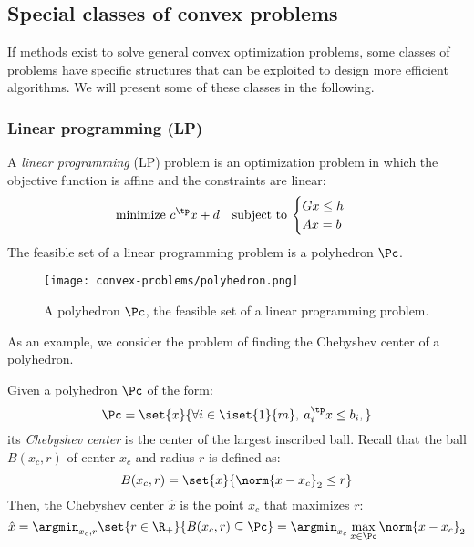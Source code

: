 \subsection{Special classes of convex problems}
If methods exist to solve general convex optimization problems, some classes of problems have specific structures that can be exploited to design more efficient algorithms. We will present some of these classes in the following.

\subsubsection{Linear programming (LP)}
\begin{definition}
    A \emph{linear programming} (LP) problem is an optimization problem in which the objective function is affine and the constraints are linear:
    \begin{equation*}
        \text{minimize } c^\tp x + d\quad\text{subject to}\: \begin{cases}
            Gx\leq h\\
            Ax=b
        \end{cases}
    \end{equation*}
    The feasible set of a linear programming problem is a polyhedron $\Pc$.
    \begin{figure}[H]
        \centering
        \texttt{[image: convex-problems/polyhedron.png]}
        \caption{A polyhedron $\Pc$, the feasible set of a linear programming problem.}
    \end{figure}
\end{definition}

As an example, we consider the problem of finding the Chebyshev center of a polyhedron.
\begin{definition}
    Given a polyhedron $\Pc$ of the form:
    \begin{equation*}
        \Pc = \set{x}{\forall i\in\iset{1}{m}, \: a_i^\tp x\leq b_i,}
    \end{equation*}
    its \emph{Chebyshev center} is the center of the largest inscribed ball. Recall that the ball $B(x_c, r)$ of center $x_c$ and radius $r$ is defined as:
    \begin{equation*}
        B(x_c, r) = \set{x}{\norm{x-x_c}_2\leq r}
    \end{equation*}
    Then, the Chebyshev center $\hat{x}$ is the point $x_c$ that maximizes $r$:
    \begin{equation*}
        \hat{x} = \argmin_{x_c, r} \set{r\in\R_+}{B(x_c, r)\subseteq\Pc} = \argmin_{x_c} \max_{x\in\Pc} \norm{x-x_c}_2
    \end{equation*}
\end{definition}


